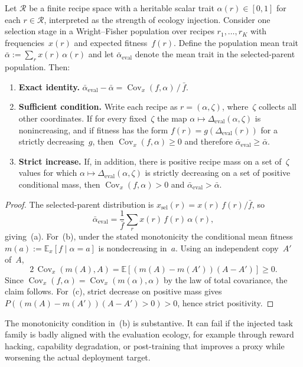 \documentclass[twoside,11pt]{article}
\newcommand{\E}{\mathbb{E}}
\newcommand{\Cov}{\operatorname{Cov}}
\begin{document}
\begin{proposition}\label{prop:recipe-trait}
Let $\mathcal{R}$ be a finite recipe space with a heritable scalar trait $\alpha(r)\in[0,1]$ for each $r\in\mathcal{R}$, interpreted as the strength of ecology injection.
Consider one selection stage in a Wright--Fisher population over recipes $r_1,\ldots,r_K$ with frequencies~$x(r)$ and expected fitness~$f(r)$.
Define the population mean trait $\bar\alpha := \sum_r x(r)\,\alpha(r)$ and let $\bar\alpha_{\mathrm{eval}}$ denote the mean trait in the selected-parent population.
Then:
\begin{enumerate}[label=(\alph*)]
\item \textbf{Exact identity.}
$\bar\alpha_{\mathrm{eval}} - \bar\alpha = \Cov_x(f,\alpha)\,/\,\bar f$.

\item \textbf{Sufficient condition.} Write each recipe as $r=(\alpha,\zeta)$, where~$\zeta$ collects all other coordinates. If for every fixed~$\zeta$ the map $\alpha\mapsto\Delta_{\mathrm{eval}}(\alpha,\zeta)$ is nonincreasing, and if fitness has the form $f(r)=g(\Delta_{\mathrm{eval}}(r))$ for a strictly decreasing~$g$, then $\Cov_x(f,\alpha)\ge 0$ and therefore $\bar\alpha_{\mathrm{eval}}\ge\bar\alpha$.

\item \textbf{Strict increase.} If, in addition, there is positive recipe mass on a set of~$\zeta$ values for which $\alpha\mapsto\Delta_{\mathrm{eval}}(\alpha,\zeta)$ is strictly decreasing on a set of positive conditional mass, then $\Cov_x(f,\alpha)>0$ and $\bar\alpha_{\mathrm{eval}}>\bar\alpha$.
\end{enumerate}
\end{proposition}

\begin{proof}
The selected-parent distribution is $x_{\mathrm{sel}}(r) = x(r)\,f(r)/\bar f$, so
\[
\bar\alpha_{\mathrm{eval}} = \frac{1}{\bar f}\sum_r x(r)\,f(r)\,\alpha(r),
\]
giving~(a). For~(b), under the stated monotonicity the conditional mean fitness $m(a):=\E_x[f\mid\alpha=a]$ is nondecreasing in~$a$. Using an independent copy~$A'$ of~$A$,
\[
2\,\Cov_x(m(A),A)=\E[(m(A)-m(A'))(A-A')]\ge 0.
\]
Since $\Cov_x(f,\alpha)=\Cov_x(m(\alpha),\alpha)$ by the law of total covariance, the claim follows. For~(c), strict decrease on positive mass gives $P((m(A)-m(A'))(A-A')>0)>0$, hence strict positivity.
\end{proof}

The monotonicity condition in~(b) is substantive. It can fail if the injected task family is badly aligned with the evaluation ecology, for example through reward hacking, capability degradation, or post-training that improves a proxy while worsening the actual deployment target.
\end{document}
